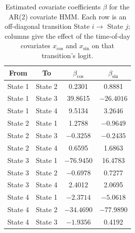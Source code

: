 \begin{table}[ht]
\centering
\begin{tabular}{cccc}
\hline
From & To & $\beta_{\cos}$ & $\beta_{\sin}$ \\
\hline
State 1 & State 2 & 0.2301 & 0.8881 \\
State 1 & State 3 & 39.8615 & $-26.4016$ \\
State 1 & State 4 & 9.5134 & 3.2646 \\
\hline
State 2 & State 1 & 1.2788 & $-0.9649$ \\
State 2 & State 3 & $-0.3258$ & $-0.2435$ \\
State 2 & State 4 & 0.6595 & 1.6863 \\
\hline
State 3 & State 1 & $-76.9450$ & 16.4783 \\
State 3 & State 2 & $-0.6978$ & 0.7277 \\
State 3 & State 4 & 2.4012 & 2.0695 \\
\hline
State 4 & State 1 & $-2.3714$ & $-5.0618$ \\
State 4 & State 2 & $-34.4690$ & $-77.9890$ \\
State 4 & State 3 & $-1.9356$ & 0.4192 \\
\hline
\end{tabular}
\caption{Estimated covariate coefficients $\beta$ for the AR(2) covariate HMM. Each row is an off-diagonal transition State $i \to$ State $j$; columns give the effect of the time-of-day covariates $x_{\cos}$ and $x_{\sin}$ on that transition's logit.}
\label{tab:ar_2_covariate_hmm_beta}
\end{table}

